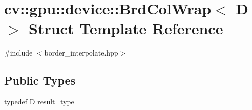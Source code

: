 \hypertarget{structcv_1_1gpu_1_1device_1_1BrdColWrap}{\section{cv\-:\-:gpu\-:\-:device\-:\-:Brd\-Col\-Wrap$<$ D $>$ Struct Template Reference}
\label{structcv_1_1gpu_1_1device_1_1BrdColWrap}
}


{\ttfamily \#include $<$border\-\_\-interpolate.\-hpp$>$}

\subsection*{Public Types}
\begin{DoxyCompactItemize}
\item 
typedef D \hyperlink{structcv_1_1gpu_1_1device_1_1BrdColWrap_a6e992e1e3cef29706e456b1aca726dc9}{result\-\_\-type}
\end{DoxyCompactItemize}
